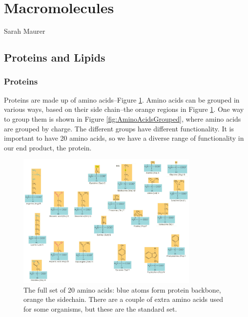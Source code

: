 \documentclass[]{article}
\begin{document}
\section{Macromolecules}

Sarah Maurer

\subsection{Proteins and Lipids}

\subsubsection{Proteins\cite[25.9 Proteins]{brown2009chemistry}}

Proteins are made up of amino acids--Figure \ref{fig:AminoAcids}. Amino acids can be grouped in various ways, based on their side chain--the orange regions in Figure \ref{fig:AminoAcids}. One way to group them is shown in Figure \ref{fig:AminoAcidsGrouped}, where amino acids are grouped by charge. The different groups have different functionality. It is important to have 20 amino acids, so we have a diverse range of functionality in our end product, the protein.

\begin{figure}[H]
	\caption[The full set of 20 amino acids]{The full set of 20 amino acids: blue atoms form protein backbone, orange the sidechain. There are a couple of extra amino acids used for some organisms, but these are the standard set.}\label{fig:AminoAcids} 
	\includegraphics[width=0.8\textwidth]{AminoAcids}
\end{figure}
\end{document}
